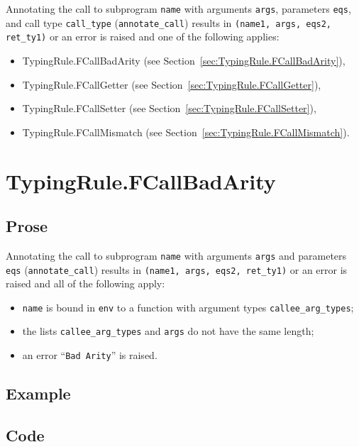 \documentclass{book}
\begin{document}
Annotating the call to subprogram \texttt{name} with arguments \texttt{args},
parameters \texttt{eqs}, and call type \texttt{call\_type} (\texttt{annotate\_call}) results in \texttt{(name1,
args, eqs2, ret\_ty1)} or an error is raised and one of the following applies:
\begin{itemize}
\item TypingRule.FCallBadArity (see Section~\ref{sec:TypingRule.FCallBadArity}),
\item TypingRule.FCallGetter (see Section~\ref{sec:TypingRule.FCallGetter}),
\item TypingRule.FCallSetter (see Section~\ref{sec:TypingRule.FCallSetter}),
\item TypingRule.FCallMismatch (see Section~\ref{sec:TypingRule.FCallMismatch}).
\end{itemize}

\section{TypingRule.FCallBadArity \label{sec:TypingRule.FCallBadArity}}

  \subsection{Prose}
  Annotating the call to subprogram \texttt{name} with arguments \texttt{args}
and parameters \texttt{eqs} (\texttt{annotate\_call}) results in
\texttt{(name1, args, eqs2, ret\_ty1)} or an error is raised and all of the
following apply:
   \begin{itemize}
   \item \texttt{name} is bound in \texttt{env} to a function with argument types \texttt{callee\_arg\_types};
   \item the lists \texttt{callee\_arg\_types} and \texttt{args} do not have the same length;
   \item an error ``\texttt{Bad Arity}'' is raised.
   \end{itemize}

  \subsection{Example}

  \subsection{Code}
\end{document}
